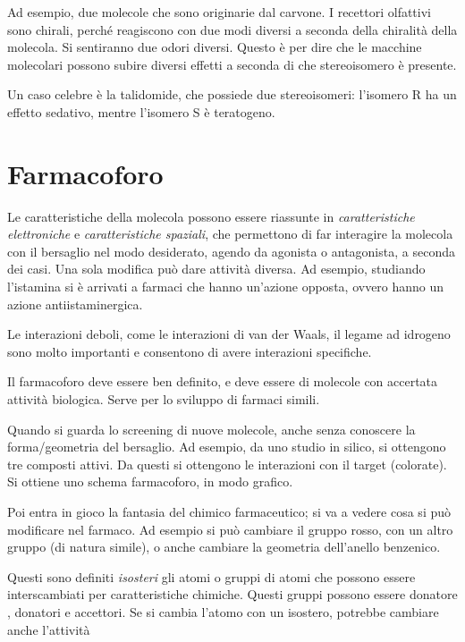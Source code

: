 Ad esempio, due molecole che sono originarie dal carvone. I recettori
olfattivi sono chirali, perché reagiscono con due modi diversi a seconda
della chiralità della molecola. Si sentiranno due odori diversi.
Questo è per dire che le macchine molecolari possono subire diversi
effetti a seconda di che stereoisomero è presente.


Un caso celebre è la talidomide, che possiede due stereoisomeri: l'isomero R ha un effetto sedativo, mentre l'isomero S è teratogeno.

\section{Farmacoforo}

Le caratteristiche della molecola possono essere riassunte in \emph{caratteristiche elettroniche} e \emph{caratteristiche spaziali}, che permettono di far interagire la molecola con il bersaglio nel modo desiderato,
agendo da agonista o antagonista, a seconda dei casi.
Una sola modifica può dare attività diversa. Ad esempio, studiando
l'istamina si è arrivati a farmaci che hanno un'azione opposta, ovvero hanno un azione antiistaminergica.


Le interazioni deboli, come le interazioni di van der Waals, il legame ad idrogeno sono molto importanti e consentono di avere interazioni specifiche.

Il farmacoforo deve essere ben definito, e deve essere di molecole con
accertata attività biologica. Serve per lo sviluppo di farmaci simili.

Quando si guarda lo screening di nuove molecole, anche senza conoscere
la forma/geometria del bersaglio.
Ad esempio, da uno studio in silico, si ottengono tre composti attivi.
Da questi si ottengono le interazioni con il target (colorate). Si
ottiene uno schema farmacoforo, in modo grafico.

Poi entra in gioco la fantasia del chimico farmaceutico; si va a vedere
cosa si può modificare nel farmaco. Ad esempio si può cambiare il gruppo
rosso, con un altro gruppo (di natura simile), o anche cambiare la
geometria dell'anello benzenico.

Questi sono definiti \emph{isosteri} gli atomi o gruppi di atomi che possono
essere interscambiati per caratteristiche chimiche. Questi gruppi possono essere donatore \pi,
donatori e accettori.
Se si cambia l'atomo con un isostero, potrebbe cambiare anche l'attività

